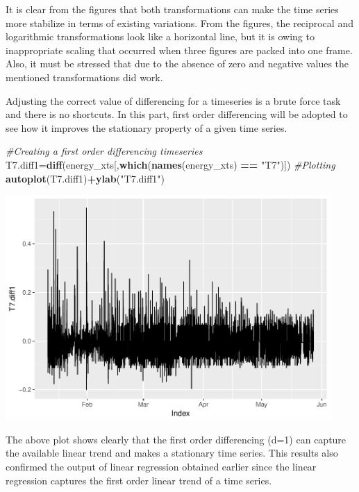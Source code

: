 \documentclass[]{article}
\newenvironment{Shaded}{\begin{snugshade}}{\end{snugshade}}
\newcommand{\KeywordTok}[1]{\textcolor[rgb]{0.13,0.29,0.53}{\textbf{#1}}}
\newcommand{\StringTok}[1]{\textcolor[rgb]{0.31,0.60,0.02}{#1}}
\newcommand{\CommentTok}[1]{\textcolor[rgb]{0.56,0.35,0.01}{\textit{#1}}}
\newcommand{\OperatorTok}[1]{\textcolor[rgb]{0.81,0.36,0.00}{\textbf{#1}}}
\newcommand{\NormalTok}[1]{#1}
\begin{document}
It is clear from the figures that both transformations can make the time
series more stabilize in terms of existing variations. From the figures,
the reciprocal and logarithmic transformations look like a horizontal
line, but it is owing to inappropriate scaling that occurred when three
figures are packed into one frame. Also, it must be stressed that due to
the absence of zero and negative values the mentioned transformations
did work.

Adjusting the correct value of differencing for a timeseries is a brute
force task and there is no shortcuts. In this part, first order
differencing will be adopted to see how it improves the stationary
property of a given time series.

\begin{Shaded}
\begin{Highlighting}[]
\CommentTok{#Creating a first order differencing timeseries}
\NormalTok{T7.diff1=}\KeywordTok{diff}\NormalTok{(energy_xts[,}\KeywordTok{which}\NormalTok{(}\KeywordTok{names}\NormalTok{(energy_xts) }\OperatorTok{==}\StringTok{ "T7"}\NormalTok{)])}
\CommentTok{#Plotting}
\KeywordTok{autoplot}\NormalTok{(T7.diff1)}\OperatorTok{+}\KeywordTok{ylab}\NormalTok{(}\StringTok{"T7.diff1"}\NormalTok{)}
\end{Highlighting}
\end{Shaded}

\includegraphics[width=468]{README_figs/README-unnamed-chunk-11-1}

The above plot shows clearly that the first order differencing (d=1) can
capture the available linear trend and makes a stationary time series.
This results also confirmed the output of linear regression obtained
earlier since the linear regression captures the first order linear
trend of a time series.
\end{document}
